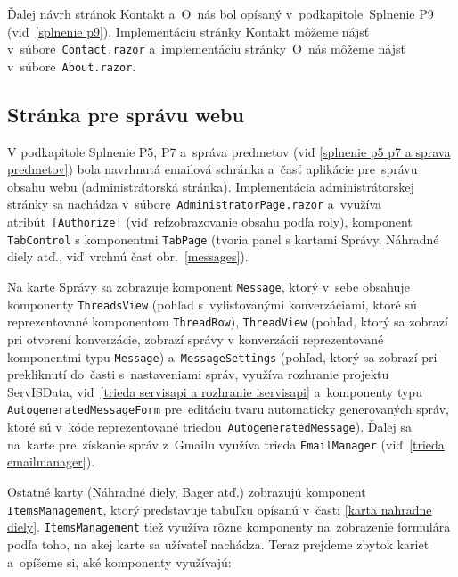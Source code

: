 Ďalej návrh stránok Kontakt a~O~nás bol opísaný v~podkapitole~Splnenie P9 (viď~\ref{splnenie p9}). Implementáciu stránky Kontakt môžeme nájsť v~súbore~\verb|Contact.razor| a~implementáciu stránky~O~nás môžeme nájsť v~súbore~\verb|About.razor|.

\subsection{Stránka pre správu webu}

V podkapitole Splnenie P5, P7 a~správa predmetov (viď \ref{splnenie p5 p7 a sprava predmetov}) bola navrhnutá emailová schránka a~časť aplikácie pre~správu obsahu webu (administrátorská stránka). Implementácia administrátorskej stránky sa nachádza v~súbore~\verb|AdministratorPage.razor| a~využíva atribút~\verb|[Authorize]| (viď~ref{zobrazovanie obsahu podľa roly}), komponent \verb|TabControl| s komponentmi \verb|TabPage| (tvoria panel s kartami Správy, Náhradné diely atď., viď~vrchnú časť obr.~\ref{messages}). 

Na karte Správy sa zobrazuje komponent \verb|Message|, ktorý v~sebe obsahuje komponenty \verb|ThreadsView| (pohľad s~vylistovanými konverzáciami, ktoré sú reprezentované komponentom \verb|ThreadRow|), \verb|ThreadView| (pohľad, ktorý sa zobrazí pri otvorení konverzácie, zobrazí správy v konverzácii reprezentované komponentmi typu \verb|Message|) a~\verb|MessageSettings| (pohľad, ktorý sa zobrazí pri prekliknutí do~časti s~nastaveniami správ, využíva rozhranie projektu ServISData, viď~\ref{trieda servisapi a rozhranie iservisapi} a~komponenty typu \verb|AutogeneratedMessageForm| pre~editáciu tvaru automaticky generovaných správ, ktoré sú v~kóde reprezentované triedou~\verb|AutogeneratedMessage|). Ďalej sa na~karte pre~získanie správ z~Gmailu využíva trieda \verb|EmailManager| (viď~\ref{trieda emailmanager}).

Ostatné karty (Náhradné diely, Bager atď.) zobrazujú komponent \verb|ItemsManagement|, ktorý predstavuje tabuľku opísanú v~časti \ref{karta nahradne diely}. \linebreak\verb|ItemsManagement| tiež využíva rôzne komponenty na~zobrazenie formulára podľa toho, na akej karte sa užívateľ nachádza. Teraz prejdeme zbytok kariet a~opíšeme si, aké komponenty využívajú:

